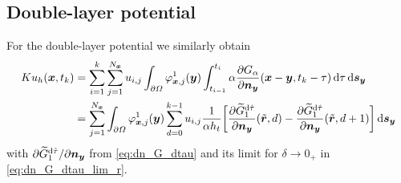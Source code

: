 \documentclass[a4paper,11pt]{article}
\begin{document}
\subsection{Double-layer potential}

For the double-layer potential we similarly obtain
\begin{align*}
  Ku_h({{\bm{x}}}, t_k) &= \sum_{i=1}^{k} \sum_{j=1}^{N_{{\bm{x}}}} u_{i,j} \int_{\partial\Omega} \varphi^1_{{{\bm{x}}},j}({{\bm{y}}}) \int_{t_{i-1}}^{t_i} \alpha \frac{\partial G_\alpha}{\partial {\ensuremath{{\bm{n}}}}_{{\bm{y}}}}({{\bm{x}}}-{{\bm{y}}},t_k-\tau) \,{\mathrm{d}}\tau \,{\mathrm{d}}{{\bm{s}}}_{{\bm{y}}} \\
  &= \sum_{j=1}^{N_{{\bm{x}}}} \int_{\partial\Omega} \varphi^1_{{{\bm{x}}},j}({{\bm{y}}}) \sum_{d=0}^{k-1} u_{i,j} \frac{1}{\alpha h_t} \bigg[ \frac{\partial \widetilde G_1^{{\mathrm{d}}\hat\tau}}{\partial {\ensuremath{{\bm{n}}}}_{{\bm{y}}}}(\tilde {{{\bm{r}}}}, d) - \frac{\partial \widetilde G_1^{{\mathrm{d}}\hat\tau}}{\partial {\ensuremath{{\bm{n}}}}_{{\bm{y}}}}(\tilde {{{\bm{r}}}}, d+1) \bigg] \,{\mathrm{d}}{{\bm{s}}}_{{\bm{y}}}
\end{align*}
with $\partial \widetilde G_1^{{\mathrm{d}}\hat\tau} / \partial {\ensuremath{{\bm{n}}}}_{{\bm{y}}}$ from \eqref{eq:dn_G_dtau} and its limit for $\delta \to 0_+$ in \eqref{eq:dn_G_dtau_lim_r}.

\newpage


\end{document}
